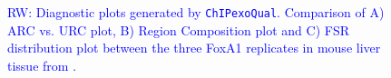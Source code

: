 \documentclass{bmcart}
\newcommand{\pname}[1]{\texttt{ChIPexoQual}}
\newcommand{\RW}[1]{\textcolor{blue}{RW: #1}}
\begin{document}
\begin{figure}[h!]
  \caption{\RW{Diagnostic plots generated by \pname{}. Comparison of
      A) ARC vs. URC plot, B) Region Composition plot and C) FSR
      distribution plot between the three FoxA1 replicates in mouse
      liver tissue from \cite{exoillumina}.}}
  \label{fig:3}
\end{figure}

\newpage




\newpage

\end{document}
